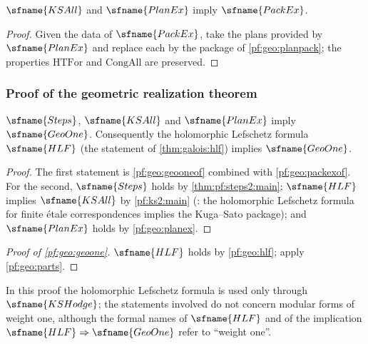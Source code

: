 \begin{corollary}\label{pf:geo:packexof}
$\sfname{KSAll}$ and $\sfname{PlanEx}$ imply $\sfname{PackEx}$.
\end{corollary}

\begin{proof}
Given the data of $\sfname{PackEx}$, take the plans provided by $\sfname{PlanEx}$ and replace each by the
package of \cref{pf:geo:planpack}; the properties $\mathrm{HTFor}$ and $\mathrm{CongAll}$ are preserved.
\end{proof}

\subsubsection{Proof of the geometric realization theorem}

\begin{theorem}\label{pf:geo:parts}
$\sfname{Steps}$, $\sfname{KSAll}$ and $\sfname{PlanEx}$ imply $\sfname{GeoOne}$. Consequently the holomorphic
Lefschetz formula $\sfname{HLF}$ (the statement of \cref{thm:galois:hlf}) implies $\sfname{GeoOne}$.
\end{theorem}

\begin{proof}
The first statement is \cref{pf:geo:geooneof} combined with \cref{pf:geo:packexof}. For the second,
$\sfname{Steps}$ holds by \cref{thm:pf:steps2:main}; $\sfname{HLF}$ implies $\sfname{KSAll}$ by
\cref{pf:ks2:main} (: the holomorphic
Lefschetz formula for finite \'etale correspondences implies the Kuga--Sato package); and
$\sfname{PlanEx}$ holds by \cref{pf:geo:planex}.
\end{proof}

\begin{proof}[Proof of \cref{pf:geo:geoone}]
$\sfname{HLF}$ holds by \cref{pf:geo:hlf}; apply \cref{pf:geo:parts}.
\end{proof}

In this proof the holomorphic Lefschetz formula is used only through $\sfname{KSHodge}$; the statements involved do not concern
modular forms of weight one, although the formal names of $\sfname{HLF}$ and of the implication $\sfname{HLF}\Rightarrow\sfname{GeoOne}$
refer to ``weight one''.

